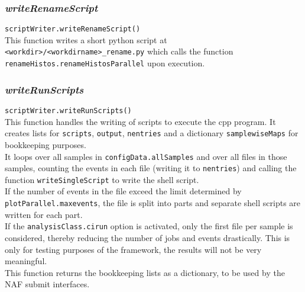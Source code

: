 \documentclass[12pt, a4paper]{article}
\begin{document}
\subsubsection{\textit{writeRenameScript}}
\label{renamescript}
\texttt{scriptWriter.writeRenameScript()}\\
This function writes a short python script at \texttt{<workdir>/<workdirname>\_rename.py} which calls the function \texttt{renameHistos.renameHistosParallel} upon execution.


\subsubsection{\textit{writeRunScripts}}
\label{runscripts}
\texttt{scriptWriter.writeRunScripts()}\\
This function handles the writing of scripts to execute the cpp program. It creates lists for \texttt{scripts}, \texttt{output}, \texttt{nentries} and a dictionary \texttt{samplewiseMaps} for bookkeeping purposes.\\
It loops over all samples in \texttt{configData.allSamples} and over all files in those samples, counting the events in each file (writing it to \texttt{nentries}) and calling the function \texttt{writeSingleScript} to write the shell script.\\
If the number of events in the file exceed the limit determined by \texttt{plotParallel.maxevents}, the file is split into parts and separate shell scripts are written for each part.\\
If the \texttt{analysisClass.cirun} option is activated, only the first file per sample is considered, thereby reducing the number of jobs and events drastically. This is only for testing purposes of the framework, the results will not be very meaningful.\\
This function returns the bookkeeping lists as a dictionary, to be used by the NAF submit interfaces.
\end{document}
